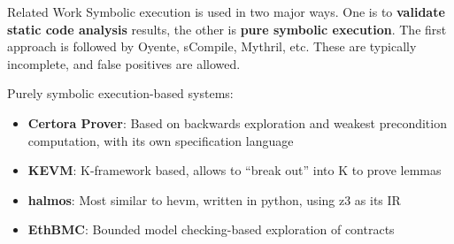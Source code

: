 \documentclass[aspectratio=169]{beamer}
\begin{document}


\begin{frame}{Related Work}
Symbolic execution is used in two major ways. One is to \textbf{validate static
code analysis} results, the other is \textbf{pure symbolic execution}. The
first approach is followed by Oyente, sCompile, Mythril, etc. These are
typically incomplete, and false positives are allowed.

\bigskip

Purely symbolic execution-based systems:
\begin{itemize}
\item \textbf{Certora Prover}: Based on backwards exploration and weakest
    precondition computation, with its own specification language
\item \textbf{KEVM}: K-framework based, allows to ``break out'' into K to prove
    lemmas
\item \textbf{halmos}: Most similar to hevm, written in python, using z3 as its
    IR
\item \textbf{EthBMC}: Bounded model checking-based exploration of contracts
\end{itemize}
\end{frame}
\end{document}
